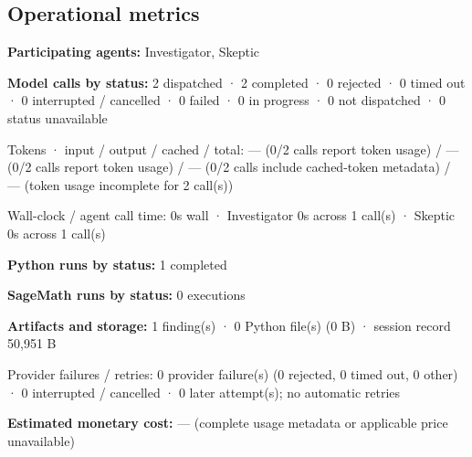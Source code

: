 \documentclass[11pt]{article}
\begin{document}
\subsection{Operational metrics}
\textbf{Participating agents:} Investigator, Skeptic\par
\textbf{Model calls by status:} 2 dispatched · 2 completed · 0 rejected · 0 timed out · 0 interrupted / cancelled · 0 failed · 0 in progress · 0 not dispatched · 0 status unavailable\par
Tokens · input / output / cached / total: — (0/2 calls report token usage) / — (0/2 calls report token usage) / — (0/2 calls include cached-token metadata) / — (token usage incomplete for 2 call(s))\par
Wall-clock / agent call time: 0s wall · Investigator 0s across 1 call(s) · Skeptic 0s across 1 call(s)\par
\textbf{Python runs by status:} 1 completed\par
\textbf{SageMath runs by status:} 0 executions\par
\textbf{Artifacts and storage:} 1 finding(s) · 0 Python file(s) (0 B) · session record 50,951 B\par
Provider failures / retries: 0 provider failure(s) (0 rejected, 0 timed out, 0 other) · 0 interrupted / cancelled · 0 later attempt(s); no automatic retries\par
\textbf{Estimated monetary cost:} — (complete usage metadata or applicable price unavailable)\par
\end{document}
